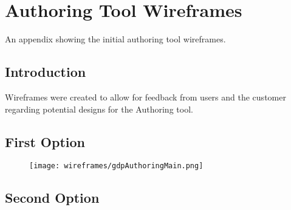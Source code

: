 \chapter{Authoring Tool Wireframes} \label{Chapter:Authoring Tool Wireframes}

\begin{preamble}
	An appendix showing the initial authoring tool wireframes.
\end{preamble}

\section{Introduction}

Wireframes were created to allow for feedback from users and the customer regarding potential designs for the Authoring tool.


\section{First Option} 

\begin{figure}
	\texttt{[image: wireframes/gdpAuthoringMain.png]}
	\caption{}
	\label{Figure:wireframes/authoringtool/main}
\end{figure}

\section{Second Option} 